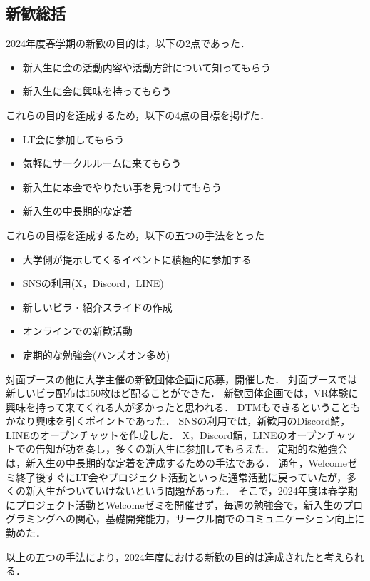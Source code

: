 \subsection*{新歓総括}


2024年度春学期の新歓の目的は，以下の2点であった．

\begin{itemize}
    \item 新入生に会の活動内容や活動方針について知ってもらう
    \item 新入生に会に興味を持ってもらう
\end{itemize}

これらの目的を達成するため，以下の4点の目標を掲げた．

\begin{itemize}
    \item LT会に参加してもらう
    \item 気軽にサークルルームに来てもらう
    \item 新入生に本会でやりたい事を見つけてもらう
    \item 新入生の中長期的な定着
\end{itemize}

これらの目標を達成するため，以下の五つの手法をとった
\begin{itemize}
    \item 大学側が提示してくるイベントに積極的に参加する
    \item SNSの利用(X，Discord，LINE)
    \item 新しいビラ・紹介スライドの作成
    \item オンラインでの新歓活動
    \item 定期的な勉強会(ハンズオン多め)
\end{itemize}

対面ブースの他に大学主催の新歓団体企画に応募，開催した．
対面ブースでは新しいビラ配布は150枚ほど配ることができた．
新歓団体企画では，VR体験に興味を持って来てくれる人が多かったと思われる．
DTMもできるということもかなり興味を引くポイントであった．
SNSの利用では，新歓用のDiscord鯖，LINEのオープンチャットを作成した．
X，Discord鯖，LINEのオープンチャットでの告知が功を奏し，多くの新入生に参加してもらえた．
定期的な勉強会は，新入生の中長期的な定着を達成するための手法である．
通年，Welcomeゼミ終了後すぐにLT会やプロジェクト活動といった通常活動に戻っていたが，多くの新入生がついていけないという問題があった．
そこで，2024年度は春学期にプロジェクト活動とWelcomeゼミを開催せず，毎週の勉強会で，新入生のプログラミングへの関心，基礎開発能力，サークル間でのコミュニケーション向上に勤めた．

以上の五つの手法により，2024年度における新歓の目的は達成されたと考えられる．
